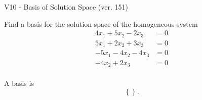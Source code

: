\begin{exercise}
  \begin{exerciseTitle}V10 - Basis of Solution Space (ver. 151)\end{exerciseTitle}
  \begin{exerciseStatement}
    Find a basis for the solution space of the homogeneous system 
\begin{align*}
 4 x_ 1 + 5 x_ 2 -2 x_ 3 &= 0  \\ 
  5 x_ 1 + 2 x_ 2 + 3 x_ 3 &= 0  \\ 
  -5 x_ 1 -4 x_ 2 -4 x_ 3 &= 0  \\ 
  + 4 x_ 2 + 2 x_ 3 &= 0  \\ 
 \end{align*}


 
  \end{exerciseStatement}

  \begin{exerciseAnswer}
   A basis is   
\[\left\{\right\}.\]

  


  \end{exerciseAnswer}
\end{exercise}